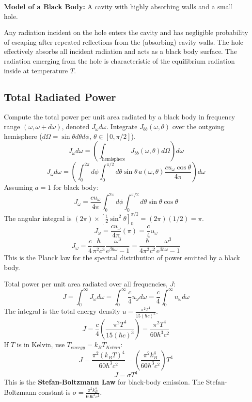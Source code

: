 \documentclass[11pt]{article}
\newcommand{\kb}{k_B} %
\begin{document}
\textbf{Model of a Black Body:} A cavity with highly absorbing walls and a small hole.

\begin{center}
\end{center}
Any radiation incident on the hole enters the cavity and has negligible probability of escaping after repeated reflections from the (absorbing) cavity walls. The hole effectively absorbs all incident radiation and acts as a black body surface. The radiation emerging from the hole is characteristic of the equilibrium radiation inside at temperature $T$.

\subsection*{Total Radiated Power}

Compute the total power per unit area radiated by a black body in frequency range $(\omega, \omega+d\omega)$, denoted $J_\omega d\omega$. Integrate $J_{bb}(\omega, \theta)$ over the outgoing hemisphere ($d\Omega = \sin\theta d\theta d\phi$, $\theta \in [0, \pi/2]$).
\[ J_\omega d\omega = \left( \int_{\text{hemisphere}} J_{bb}(\omega, \theta) d\Omega \right) d\omega \]
\[ J_\omega d\omega = \left( \int_0^{2\pi} d\phi \int_0^{\pi/2} d\theta \sin\theta \, a(\omega,\theta) \frac{c u_\omega \cos\theta}{4\pi} \right) d\omega \]
Assuming $a=1$ for black body:
\[ J_\omega = \frac{c u_\omega}{4\pi} \int_0^{2\pi} d\phi \int_0^{\pi/2} d\theta \sin\theta \cos\theta \]
The angular integral is $(2\pi) \times [\frac{1}{2}\sin^2\theta]_0^{\pi/2} = (2\pi)(1/2) = \pi$.
\[ J_\omega = \frac{c u_\omega}{4\pi} (\pi) = \frac{c}{4} u_\omega \]
\[ J_\omega = \frac{c}{4} \frac{\hbar}{\pi^2 c^3} \frac{\omega^3}{e^{\beta\hbar\omega}-1} = \frac{\hbar}{4\pi^2 c^2} \frac{\omega^3}{e^{\beta\hbar\omega}-1} \]
This is the Planck law for the spectral distribution of power emitted by a black body.

Total power per unit area radiated over all frequencies, $J$:
\[ J = \int_0^\infty J_\omega d\omega = \int_0^\infty \frac{c}{4} u_\omega d\omega = \frac{c}{4} \int_0^\infty u_\omega d\omega \]
The integral is the total energy density $u = \frac{\pi^2 T^4}{15 (\hbar c)^3}$.
\[ J = \frac{c}{4} \left( \frac{\pi^2 T^4}{15 (\hbar c)^3} \right) = \frac{\pi^2 T^4}{60 \hbar^3 c^2} \]
If $T$ is in Kelvin, use $T_{energy} = \kb T_{Kelvin}$:
\[ J = \frac{\pi^2 (\kb T)^4}{60 \hbar^3 c^2} = \left( \frac{\pi^2 \kb^4}{60 \hbar^3 c^2} \right) T^4 \]
\[ J = \sigma T^4 \]
This is the \textbf{Stefan-Boltzmann Law} for black-body emission.
The Stefan-Boltzmann constant is $\sigma = \frac{\pi^2 \kb^4}{60 \hbar^3 c^2}$.
\end{document}
